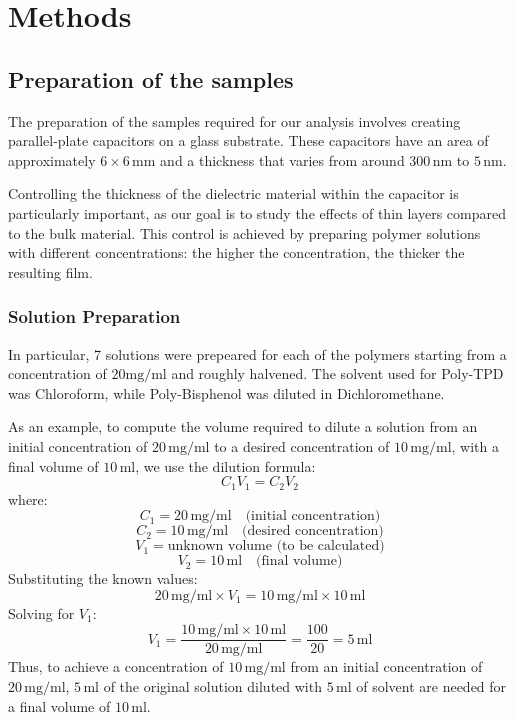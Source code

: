 \chapter{Methods}

\section{Preparation of the samples}

The preparation of the samples required for our analysis involves creating parallel-plate capacitors on a glass substrate. These capacitors have an area of approximately \( 6 \times 6 \, \text{mm} \) and a thickness that varies from around \( 300 \, \text{nm} \) to \( 5 \, \text{nm} \).

Controlling the thickness of the dielectric material %
within the capacitor is particularly important, as our goal is to study the effects of thin layers compared to the bulk material. This control is achieved by preparing polymer solutions with different concentrations: the higher the concentration, the thicker the resulting film.
\subsection{Solution Preparation}

In particular, 7 solutions were prepeared for each of the polymers starting from a concentration of $20 \text{mg/ml}$ %
and roughly halvened.
The solvent used for Poly-TPD was Chloroform, while Poly-Bisphenol was diluted in Dichloromethane.

As an example, to compute the volume required to dilute a solution from an initial concentration of \( 20 \, \text{mg/ml} \) to a desired concentration of \( 10 \, \text{mg/ml} \), with a final volume of \( 10 \, \text{ml} \), we use the dilution formula:
\[
C_1 V_1 = C_2 V_2
\]
where:
\[
C_1 = 20 \, \text{mg/ml} \quad \text{(initial concentration)}
\]
\[
C_2 = 10 \, \text{mg/ml} \quad \text{(desired concentration)}
\]
\[
V_1 = \text{unknown volume (to be calculated)}
\]
\[
V_2 = 10 \, \text{ml} \quad \text{(final volume)}
\]
Substituting the known values:
\[
20 \, \text{mg/ml} \times V_1 = 10 \, \text{mg/ml} \times 10 \, \text{ml}
\]
Solving for \( V_1 \):
\[
V_1 = \frac{10 \, \text{mg/ml} \times 10 \, \text{ml}}{20 \, \text{mg/ml}} = \frac{100}{20} = 5 \, \text{ml}
\]
Thus, to achieve a concentration of \( 10 \, \text{mg/ml} \) from an initial concentration of \( 20 \, \text{mg/ml} \), \( 5 \, \text{ml} \) of the original solution diluted with \( 5 \, \text{ml} \) of solvent are needed for a final volume of \( 10 \, \text{ml} \).


